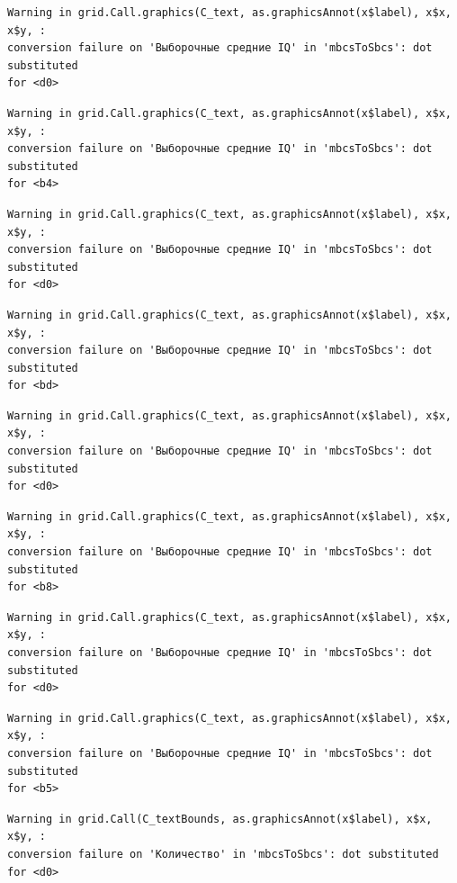 \documentclass[
  letterpaper,
  DIV=11,
  numbers=noendperiod]{scrreprt}
\theoremstyle{definition}
\theoremstyle{remark}
\begin{document}
\begin{verbatim}
Warning in grid.Call.graphics(C_text, as.graphicsAnnot(x$label), x$x, x$y, :
conversion failure on 'Выборочные средние IQ' in 'mbcsToSbcs': dot substituted
for <d0>
\end{verbatim}

\begin{verbatim}
Warning in grid.Call.graphics(C_text, as.graphicsAnnot(x$label), x$x, x$y, :
conversion failure on 'Выборочные средние IQ' in 'mbcsToSbcs': dot substituted
for <b4>
\end{verbatim}

\begin{verbatim}
Warning in grid.Call.graphics(C_text, as.graphicsAnnot(x$label), x$x, x$y, :
conversion failure on 'Выборочные средние IQ' in 'mbcsToSbcs': dot substituted
for <d0>
\end{verbatim}

\begin{verbatim}
Warning in grid.Call.graphics(C_text, as.graphicsAnnot(x$label), x$x, x$y, :
conversion failure on 'Выборочные средние IQ' in 'mbcsToSbcs': dot substituted
for <bd>
\end{verbatim}

\begin{verbatim}
Warning in grid.Call.graphics(C_text, as.graphicsAnnot(x$label), x$x, x$y, :
conversion failure on 'Выборочные средние IQ' in 'mbcsToSbcs': dot substituted
for <d0>
\end{verbatim}

\begin{verbatim}
Warning in grid.Call.graphics(C_text, as.graphicsAnnot(x$label), x$x, x$y, :
conversion failure on 'Выборочные средние IQ' in 'mbcsToSbcs': dot substituted
for <b8>
\end{verbatim}

\begin{verbatim}
Warning in grid.Call.graphics(C_text, as.graphicsAnnot(x$label), x$x, x$y, :
conversion failure on 'Выборочные средние IQ' in 'mbcsToSbcs': dot substituted
for <d0>
\end{verbatim}

\begin{verbatim}
Warning in grid.Call.graphics(C_text, as.graphicsAnnot(x$label), x$x, x$y, :
conversion failure on 'Выборочные средние IQ' in 'mbcsToSbcs': dot substituted
for <b5>
\end{verbatim}

\begin{verbatim}
Warning in grid.Call(C_textBounds, as.graphicsAnnot(x$label), x$x, x$y, :
conversion failure on 'Количество' in 'mbcsToSbcs': dot substituted for <d0>
\end{verbatim}
\end{document}
